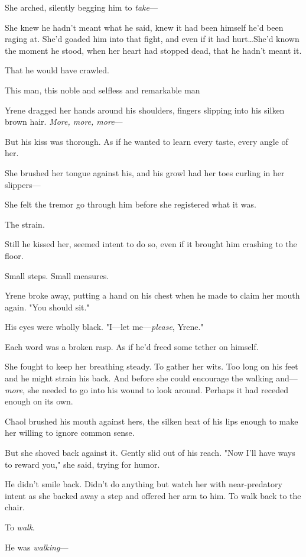 She arched, silently begging him to \emph{take}---

She knew he hadn't meant what he said, knew it had been himself he'd been raging at.
She'd goaded him into that fight, and even if it had hurt\ldots She'd known the moment he stood, when her heart had stopped dead, that he hadn't meant it.

That he would have crawled.

This man, this noble and selfless and remarkable man 

Yrene dragged her hands around his shoulders, fingers slipping into his silken brown hair.
\emph{More, more, more}---

But his kiss was thorough.
As if he wanted to learn every taste, every angle of her.

She brushed her tongue against his, and his growl had her toes curling in her slippers---

She felt the tremor go through him before she registered what it was.

The strain.

Still he kissed her, seemed intent to do so, even if it brought him crashing to the floor.

Small steps.
Small measures.

Yrene broke away, putting a hand on his chest when he made to claim her mouth again.
"You should sit."

His eyes were wholly black.
"I---let me---\emph{please}, Yrene."

Each word was a broken rasp.
As if he'd freed some tether on himself.

She fought to keep her breathing steady.
To gather her wits.
Too long on his feet and he might strain his back.
And before she could encourage the walking and---\emph{more}, she needed to go into his wound to look around.
Perhaps it had receded enough on its own.

Chaol brushed his mouth against hers, the silken heat of his lips enough to make her willing to ignore common sense.

But she shoved back against it.
Gently slid out of his reach.
"Now I'll have ways to reward you," she said, trying for humor.

He didn't smile back.
Didn't do anything but watch her with near-predatory intent as she backed away a step and offered her arm to him.
To walk back to the chair.

To \emph{walk}.

He was \emph{walking}---


